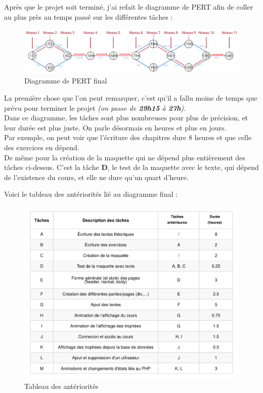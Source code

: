 Après que le projet soit terminé, j'ai refait le diagramme de PERT afin de coller au plus près au temps passé sur les différentes tâches :

\begin{figure}[h]
  \centering
  \includegraphics[scale=0.49]
  {textures/images/diagrammes/DiagrammeDePert2.pdf}
  \caption{Diagramme de PERT final}
  \label{fig:pert-final}
\end{figure}

La première chose que l'on peut remarquer, c'est qu'il a fallu moins de temps que prévu pour terminer le projet \textit{(on passe de \textbf{29h15} à \textbf{27h})}. \\

Dans ce diagramme, les tâches sont plus nombreuses pour plus de précision, et leur durée est plus juste. On parle désormais en heures et plus en jours. \\
Par exemple, on peut voir que l'écriture des chapitres dure 8 heures et que celle des exercices en dépend. \\
De même pour la création de la maquette qui ne dépend plus entièrement des tâches ci-dessus. C'est la tâche \textbf{D}, le test de la maquette avec le texte, qui dépend de l'existence du cours, et elle ne dure qu'un quart d'heure.

\newpage

Voici le tableau des antériorités lié au diagramme final :

\begin{figure}[h]
  \centering
  \includegraphics[scale=0.6]
  {textures/images/diagrammes/TableauDesAnteriorites.pdf}
  \caption{Tableau des antériorités}
  \label{fig:tableau-anteriorites}
\end{figure}


